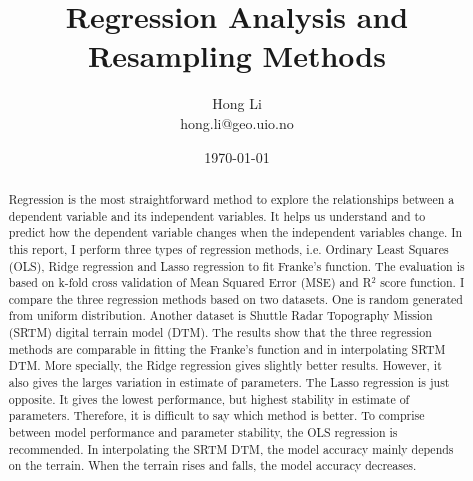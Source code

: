 \documentclass[a4paper]{article}
\title{Regression Analysis and Resampling Methods}
\author{Hong Li\\hong.li@geo.uio.no}
\date{\today}
\begin{document}
\maketitle
\captionsetup[subfigure]{labelformat=empty}

\begin{abstract}
Regression is the most straightforward method to explore the relationships between a dependent variable and its independent variables. It helps us understand and to predict how the dependent variable changes when the independent variables change. In this report, I perform three types of regression methods, i.e. Ordinary Least Squares (OLS), Ridge regression and Lasso regression to fit Franke's function. The evaluation is based on k-fold cross validation of Mean Squared Error (MSE) and R$^2$ score function. I compare the three regression methods based on two datasets. One is random generated from uniform distribution. Another dataset is Shuttle Radar Topography Mission (SRTM) digital terrain model (DTM). The results show that the three regression methods are comparable in fitting the Franke's function and in interpolating SRTM DTM. More specially, the Ridge regression gives slightly better results. However, it also gives the larges variation in estimate of parameters. The Lasso regression is just opposite. It gives the lowest performance, but highest stability in estimate of parameters. Therefore, it is difficult to say which method is better. To comprise between model performance and parameter stability, the OLS regression is recommended. In interpolating the SRTM DTM, the model accuracy mainly depends on the terrain. When the terrain rises and falls, the model accuracy decreases.
\end{abstract}
\end{document}
